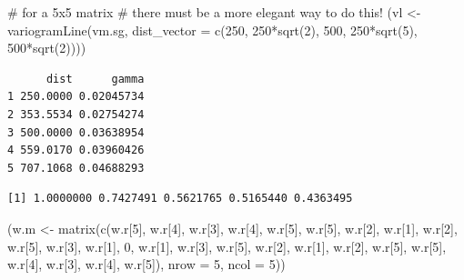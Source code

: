 \documentclass[
  letterpaper,
  DIV=11,
  numbers=noendperiod]{scrartcl}
\newenvironment{Shaded}{\begin{snugshade}}{\end{snugshade}}
\newcommand{\AttributeTok}[1]{\textcolor[rgb]{0.40,0.45,0.13}{#1}}
\newcommand{\CommentTok}[1]{\textcolor[rgb]{0.37,0.37,0.37}{#1}}
\newcommand{\DecValTok}[1]{\textcolor[rgb]{0.68,0.00,0.00}{#1}}
\newcommand{\FunctionTok}[1]{\textcolor[rgb]{0.28,0.35,0.67}{#1}}
\newcommand{\NormalTok}[1]{\textcolor[rgb]{0.00,0.23,0.31}{#1}}
\newcommand{\OtherTok}[1]{\textcolor[rgb]{0.00,0.23,0.31}{#1}}
\newcommand{\SpecialCharTok}[1]{\textcolor[rgb]{0.37,0.37,0.37}{#1}}
\begin{document}
\begin{Shaded}
\begin{Highlighting}[]
\CommentTok{\# for a 5x5 matrix}
\CommentTok{\# there must be a more elegant way to do this!}
\NormalTok{(vl }\OtherTok{\textless{}{-}} \FunctionTok{variogramLine}\NormalTok{(vm.sg, }
                     \AttributeTok{dist\_vector =} \FunctionTok{c}\NormalTok{(}\DecValTok{250}\NormalTok{, }\DecValTok{250}\SpecialCharTok{*}\FunctionTok{sqrt}\NormalTok{(}\DecValTok{2}\NormalTok{), }
                                     \DecValTok{500}\NormalTok{, }\DecValTok{250}\SpecialCharTok{*}\FunctionTok{sqrt}\NormalTok{(}\DecValTok{5}\NormalTok{), }
                                     \DecValTok{500}\SpecialCharTok{*}\FunctionTok{sqrt}\NormalTok{(}\DecValTok{2}\NormalTok{))))}
\end{Highlighting}
\end{Shaded}

\begin{verbatim}
      dist      gamma
1 250.0000 0.02045734
2 353.5534 0.02754274
3 500.0000 0.03638954
4 559.0170 0.03960426
5 707.1068 0.04688293
\end{verbatim}

\begin{Shaded}
\end{Shaded}

\begin{verbatim}
[1] 1.0000000 0.7427491 0.5621765 0.5165440 0.4363495
\end{verbatim}

\begin{Shaded}
\begin{Highlighting}[]
\NormalTok{(w.m }\OtherTok{\textless{}{-}} \FunctionTok{matrix}\NormalTok{(}\FunctionTok{c}\NormalTok{(w.r[}\DecValTok{5}\NormalTok{], w.r[}\DecValTok{4}\NormalTok{], w.r[}\DecValTok{3}\NormalTok{], w.r[}\DecValTok{4}\NormalTok{], w.r[}\DecValTok{5}\NormalTok{],}
\NormalTok{                w.r[}\DecValTok{5}\NormalTok{], w.r[}\DecValTok{2}\NormalTok{], w.r[}\DecValTok{1}\NormalTok{], w.r[}\DecValTok{2}\NormalTok{], w.r[}\DecValTok{5}\NormalTok{],}
\NormalTok{                w.r[}\DecValTok{3}\NormalTok{], w.r[}\DecValTok{1}\NormalTok{], }\DecValTok{0}\NormalTok{, w.r[}\DecValTok{1}\NormalTok{], w.r[}\DecValTok{3}\NormalTok{],}
\NormalTok{                w.r[}\DecValTok{5}\NormalTok{], w.r[}\DecValTok{2}\NormalTok{], w.r[}\DecValTok{1}\NormalTok{], w.r[}\DecValTok{2}\NormalTok{], w.r[}\DecValTok{5}\NormalTok{],}
\NormalTok{                w.r[}\DecValTok{5}\NormalTok{], w.r[}\DecValTok{4}\NormalTok{], w.r[}\DecValTok{3}\NormalTok{], w.r[}\DecValTok{4}\NormalTok{], w.r[}\DecValTok{5}\NormalTok{]), }
                \AttributeTok{nrow =} \DecValTok{5}\NormalTok{, }\AttributeTok{ncol =} \DecValTok{5}\NormalTok{))}
\end{Highlighting}
\end{Shaded}
\end{document}
